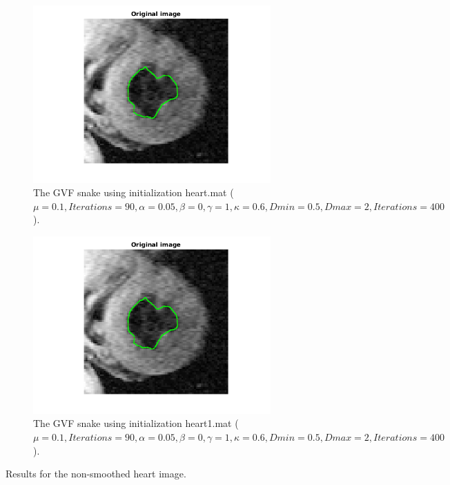 \documentclass{article}
\begin{document}
\begin{figure}[H]
\begin{subfigure}{0.49\textwidth}
  \centering
  \includegraphics[width=\linewidth]{fig6c.png}
  \caption{The GVF snake using initialization heart.mat ($\mu=0.1, Iterations=90, \alpha=0.05, \beta=0, \gamma=1,\kappa=0.6,Dmin=0.5,Dmax=2, Iterations=400$).}
  \label{fig6c}
\end{subfigure}
\begin{subfigure}{0.49\textwidth}
  \centering
  \includegraphics[width=\linewidth]{fig6d.png}
  \caption{The GVF snake using initialization heart1.mat ($\mu=0.1, Iterations=90, \alpha=0.05, \beta=0, \gamma=1,\kappa=0.6,Dmin=0.5,Dmax=2, Iterations=400$).}
  \label{fig6d}
\end{subfigure}
\caption{Results for the non-smoothed heart image.}
\label{fig6}
\end{figure}
\end{document}
